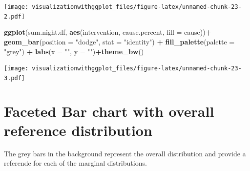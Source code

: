 \documentclass[]{krantz}
\makeatletter
\newenvironment{Shaded}{\begin{snugshade}}{\end{snugshade}}
\newcommand{\KeywordTok}[1]{\textcolor[rgb]{0.13,0.29,0.53}{\textbf{#1}}}
\newcommand{\DataTypeTok}[1]{\textcolor[rgb]{0.13,0.29,0.53}{#1}}
\newcommand{\DecValTok}[1]{\textcolor[rgb]{0.00,0.00,0.81}{#1}}
\newcommand{\StringTok}[1]{\textcolor[rgb]{0.31,0.60,0.02}{#1}}
\newcommand{\OperatorTok}[1]{\textcolor[rgb]{0.81,0.36,0.00}{\textbf{#1}}}
\newcommand{\NormalTok}[1]{#1}
\newenvironment{kframe}{%
\medskip{}
\setlength{\fboxsep}{.8em}
 \def\at@end@of@kframe{}%
 \ifinner\ifhmode%
  \def\at@end@of@kframe{\end{minipage}}%
  \begin{minipage}{\columnwidth}%
 \fi\fi%
 \def\FrameCommand##1{\hskip\@totalleftmargin \hskip-\fboxsep
 \colorbox{shadecolor}{##1}\hskip-\fboxsep
     \hskip-\linewidth \hskip-\@totalleftmargin \hskip\columnwidth}%
 \MakeFramed {\advance\hsize-\width
   \@totalleftmargin\z@ \linewidth\hsize
   \@setminipage}}%
 {\par\unskip\endMakeFramed%
 \at@end@of@kframe}
\renewenvironment{Shaded}{\begin{kframe}}{\end{kframe}}
\theoremstyle{definition}
\theoremstyle{definition}
\theoremstyle{definition}
\theoremstyle{remark}
\makeatother
\begin{document}
\texttt{[image: visualizationwithggplot\_files/figure-latex/unnamed-chunk-23-2.pdf]}

\begin{Shaded}
\begin{Highlighting}[]
\KeywordTok{ggplot}\NormalTok{(sum.night.df, }\KeywordTok{aes}\NormalTok{(intervention, cause.percent, }\DataTypeTok{fill =}\NormalTok{ cause))}\OperatorTok{+}
\StringTok{    }\KeywordTok{geom_bar}\NormalTok{(}\DataTypeTok{position =} \StringTok{"dodge"}\NormalTok{, }\DataTypeTok{stat =} \StringTok{"identity"}\NormalTok{) }\OperatorTok{+}
\StringTok{   }\KeywordTok{fill_palette}\NormalTok{(}\DataTypeTok{palette =} \StringTok{"grey"}\NormalTok{) }\OperatorTok{+}
\StringTok{   }\KeywordTok{labs}\NormalTok{(}\DataTypeTok{x =} \StringTok{""}\NormalTok{, }\DataTypeTok{y =} \StringTok{""}\NormalTok{)}\OperatorTok{+}\KeywordTok{theme_bw}\NormalTok{()}
\end{Highlighting}
\end{Shaded}

\texttt{[image: visualizationwithggplot\_files/figure-latex/unnamed-chunk-23-3.pdf]}

\section{Faceted Bar chart with overall reference
distribution}\label{faceted-bar-chart-with-overall-reference-distribution}

The grey bars in the background represent the overall distribution and
provide a referende for each of the marginal distributions.

\begin{Shaded}
\end{Shaded}
\end{document}
